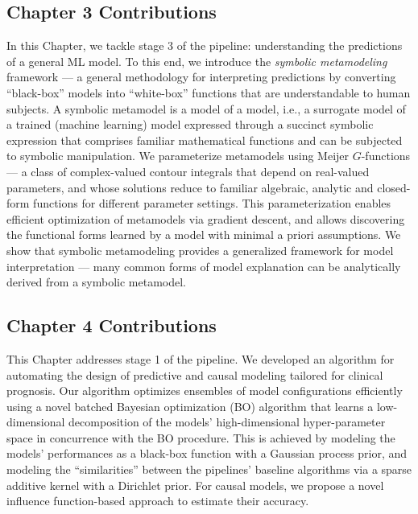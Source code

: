 \documentclass [PhD] {uclathes}
\begin{document}
\subsection*{Chapter 3 Contributions}
In this Chapter, we tackle stage 3 of the pipeline: understanding the predictions of a general ML model. To this end, we introduce the \textit{symbolic metamodeling} framework --- a general methodology for interpreting predictions by converting ``black-box'' models into ``white-box'' functions that are understandable to human subjects. A symbolic metamodel is a model of a model, i.e., a surrogate model of a trained (machine learning) model expressed through a succinct symbolic expression that comprises familiar mathematical functions and can be subjected to symbolic manipulation. We parameterize metamodels using Meijer $G$-functions --- a class of complex-valued contour integrals that depend on real-valued parameters, and whose solutions reduce to familiar algebraic, analytic and closed-form functions for different parameter settings. This parameterization enables efficient optimization of metamodels via gradient descent, and allows discovering the functional forms learned by a model with minimal a priori assumptions. We show that symbolic metamodeling provides a generalized framework for model interpretation — many common forms of model explanation can be analytically derived from a symbolic metamodel.

\subsection*{Chapter 4 Contributions}
This Chapter addresses stage 1 of the pipeline. We developed an algorithm for automating the design of predictive and causal modeling tailored for clinical prognosis. Our algorithm optimizes ensembles of model configurations efficiently using a novel batched Bayesian optimization (BO) algorithm that learns a low-dimensional decomposition of the models' high-dimensional hyper-parameter space in concurrence with the BO procedure. This is achieved by modeling the models' performances as a black-box function with a Gaussian process prior, and modeling the ``similarities'' between the pipelines' baseline algorithms via a sparse additive kernel with a Dirichlet prior. For causal models, we propose a novel influence function-based approach to estimate their accuracy.
\end{document}
